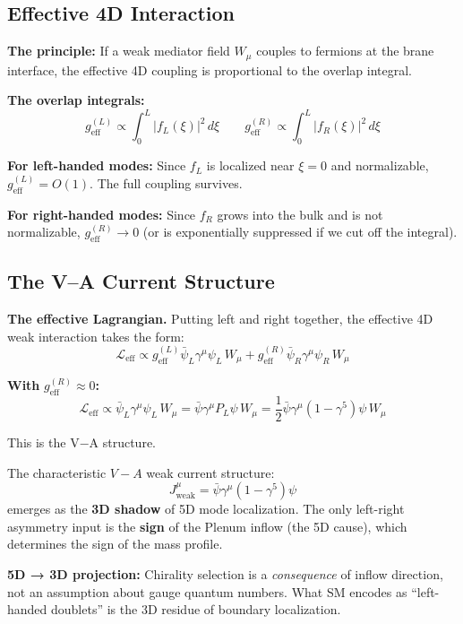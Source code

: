 \subsection{Effective 4D Interaction}

\textbf{The principle:} If a weak mediator field $W_\mu$ couples to fermions at
the brane interface, the effective 4D coupling is proportional to the overlap integral.

\textbf{The overlap integrals:}
\begin{equation}
    g_{\text{eff}}^{(L)} \propto \int_0^L |f_L(\xi)|^2 \, d\xi
    \qquad
    g_{\text{eff}}^{(R)} \propto \int_0^L |f_R(\xi)|^2 \, d\xi
    \label{eq:ch9_overlap}
\end{equation}

\textbf{For left-handed modes:} Since $f_L$ is localized near $\xi = 0$ and
normalizable, $g_{\text{eff}}^{(L)} = O(1)$. The full coupling survives.

\textbf{For right-handed modes:} Since $f_R$ grows into the bulk and is not
normalizable, $g_{\text{eff}}^{(R)} \to 0$ (or is exponentially suppressed if
we cut off the integral).

\subsection{The V–A Current Structure}

\textbf{The effective Lagrangian.} Putting left and right together, the
effective 4D weak interaction takes the form:
\begin{equation}
    \mathcal{L}_{\text{eff}} \propto g_{\text{eff}}^{(L)} \bar\psi_L \gamma^\mu \psi_L \, W_\mu
    + g_{\text{eff}}^{(R)} \bar\psi_R \gamma^\mu \psi_R \, W_\mu
    \label{eq:ch9_L_eff}
\end{equation}

\textbf{With} $g_{\text{eff}}^{(R)} \approx 0$\textbf{:}
\begin{equation}
    \mathcal{L}_{\text{eff}} \propto \bar\psi_L \gamma^\mu \psi_L \, W_\mu
    = \bar\psi \gamma^\mu P_L \psi \, W_\mu
    = \frac{1}{2} \bar\psi \gamma^\mu (1 - \gamma^5) \psi \, W_\mu
    \label{eq:ch9_va_derived}
\end{equation}

This is the V$-$A structure.

\begin{tcolorbox}[edcCanonical, title=\textbf{V–A Structure Emergence [Dc]}]
The characteristic $V{-}A$ weak current structure:
\begin{equation}
    J^\mu_{\text{weak}} = \bar\psi \gamma^\mu (1 - \gamma^5) \psi
\end{equation}
emerges as the \textbf{3D shadow} of 5D mode localization. The only left-right
asymmetry input is the \textbf{sign} of the Plenum inflow (the 5D cause), which
determines the sign of the mass profile.

\textbf{5D → 3D projection:} Chirality selection is a \emph{consequence} of
inflow direction, not an assumption about gauge quantum numbers. What SM
encodes as ``left-handed doublets'' is the 3D residue of boundary localization.
\end{tcolorbox}

